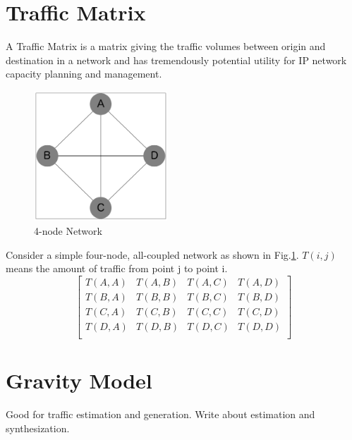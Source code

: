 \section{Traffic Matrix}
A Traffic Matrix is a matrix giving the traffic volumes between origin and destination in a network and has tremendously potential utility for IP network capacity planning and management.\cite{trafficmatrix}
\begin{figure}[!ht]
  \centering
  \includegraphics[width=5cm]{img/4node-graph.png}
  \caption{4-node Network}
  \label{fig:net} 
\end{figure}

\begin{screen}
  \begin{dfn}
    Consider a simple four-node, all-coupled network as shown in Fig.\ref{fig:net}.
    $T(i,j)$ means the amount of traffic from point j to point i. 
      \begin{equation}
          \begin{bmatrix}
            T(A,A) & T(A,B) & T(A,C) & T(A,D) \\
            T(B,A) & T(B,B) & T(B,C) & T(B,D) \\
            T(C,A) & T(C,B) & T(C,C) & T(C,D) \\
            T(D,A) & T(D,B) & T(D,C) & T(D,D) \\
          \end{bmatrix}
      \end{equation}
  \end{dfn}
\end{screen}


\section{Gravity Model}
Good for traffic estimation and generation.
Write about estimation and synthesization.

